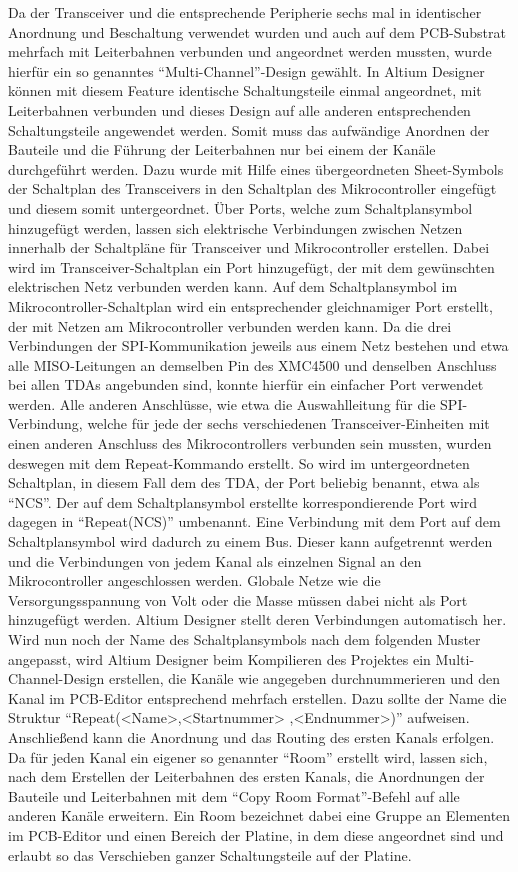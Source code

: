 Da der Transceiver und die entsprechende Peripherie sechs mal in identischer Anordnung und Beschaltung verwendet wurden und auch auf dem \ac{PCB}-Substrat mehrfach mit Leiterbahnen verbunden und angeordnet werden mussten, wurde hierfür ein so genanntes \enquote{Multi-Channel}-Design gewählt. In Altium Designer können mit diesem Feature identische Schaltungsteile einmal angeordnet, mit Leiterbahnen verbunden  und dieses Design auf alle anderen entsprechenden Schaltungsteile angewendet werden. Somit muss das aufwändige Anordnen der Bauteile und die Führung der Leiterbahnen nur bei einem der Kanäle durchgeführt werden.  Dazu wurde mit Hilfe eines übergeordneten Sheet-Symbols der Schaltplan des Transceivers in den Schaltplan des Mikrocontroller eingefügt und diesem somit untergeordnet. Über Ports, welche zum  Schaltplansymbol hinzugefügt werden, lassen sich elektrische Verbindungen zwischen Netzen innerhalb der Schaltpläne für Transceiver  und Mikrocontroller erstellen. Dabei wird im Transceiver-Schaltplan ein Port hinzugefügt, der mit dem gewünschten elektrischen Netz  verbunden werden kann. Auf dem Schaltplansymbol im Mikrocontroller-Schaltplan wird ein entsprechender gleichnamiger Port erstellt, der mit Netzen am Mikrocontroller verbunden werden kann. Da die drei Verbindungen der \ac{SPI}-Kommunikation jeweils aus einem Netz bestehen und etwa alle \acs{MISO}-Leitungen an demselben Pin des XMC4500 und denselben Anschluss bei allen TDAs angebunden sind, konnte hierfür ein einfacher Port verwendet werden. Alle anderen Anschlüsse, wie etwa die Auswahlleitung für die \ac{SPI}-Verbindung, welche für jede der sechs verschiedenen Transceiver-Einheiten mit einen anderen Anschluss des Mikrocontrollers verbunden sein mussten, wurden deswegen mit dem Repeat-Kommando erstellt. So wird im untergeordneten Schaltplan, in diesem Fall dem des TDA, der Port beliebig benannt, etwa als \enquote{NCS}. Der auf dem Schaltplansymbol erstellte korrespondierende Port wird dagegen in \enquote{Repeat(NCS)} umbenannt. Eine Verbindung mit dem Port auf dem Schaltplansymbol wird dadurch zu einem Bus. Dieser kann aufgetrennt werden und die Verbindungen von jedem Kanal als einzelnen Signal an den Mikrocontroller angeschlossen werden. Globale Netze wie die Versorgungsspannung von \unit[3,3]{Volt} oder die Masse müssen dabei nicht als Port hinzugefügt werden. Altium Designer stellt deren Verbindungen automatisch her. Wird nun noch der Name des Schaltplansymbols nach dem folgenden Muster angepasst, wird Altium Designer beim Kompilieren des Projektes ein Multi-Channel-Design erstellen, die Kanäle wie angegeben durchnummerieren und den Kanal im \ac{PCB}-Editor entsprechend mehrfach erstellen. Dazu sollte der Name die Struktur \enquote{Repeat(<Name>,<Startnummer> ,<Endnummer>)} aufweisen. Anschließend kann die Anordnung und das Routing des ersten Kanals erfolgen. Da für jeden Kanal ein eigener so genannter \enquote{Room} erstellt wird, lassen sich, nach dem Erstellen der Leiterbahnen des ersten Kanals, die Anordnungen der Bauteile und Leiterbahnen mit dem \enquote{Copy Room Format}-Befehl auf alle anderen Kanäle erweitern. Ein Room bezeichnet dabei eine Gruppe an Elementen im PCB-Editor und einen Bereich der Platine, in dem diese angeordnet sind und erlaubt so das Verschieben ganzer Schaltungsteile auf der Platine. 